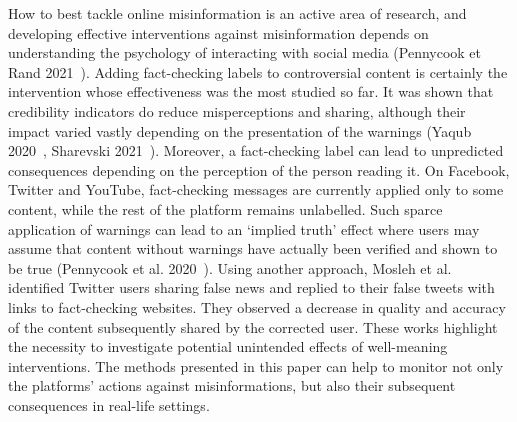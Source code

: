 \documentclass{article}
\begin{document}
\smallskip

How to best tackle online misinformation is an active area of research, and developing effective interventions against misinformation depends on understanding the psychology of interacting with social media (Pennycook et Rand 2021~\cite{pennycook2021psychology}). 
Adding fact-checking labels to controversial content is certainly the intervention whose effectiveness was the most studied so far. 
It was shown that credibility indicators do reduce misperceptions and sharing, although their impact varied vastly depending on the presentation of the warnings (Yaqub 2020~\cite{yaqub2020effects}, Sharevski 2021~\cite{sharevski2021misinformation}).
Moreover, a fact-checking label can lead to unpredicted consequences depending on the perception of the person reading it.
On Facebook, Twitter and YouTube, fact-checking messages are currently applied only to some content, while the rest of the platform remains unlabelled. 
Such sparce application of warnings can lead to an `implied truth' effect where users may assume that content without warnings have actually been verified and shown to be true (Pennycook et al. 2020~\cite{pennycook2020implied}).
Using another approach, Mosleh et al. \cite{mosleh2021perverse} identified Twitter users sharing false news and replied to their false tweets with links to fact-checking websites.
They observed a decrease in quality and accuracy of the content subsequently shared by the corrected user. 
These works highlight the necessity to investigate potential unintended effects of well-meaning interventions.
The methods presented in this paper can help to monitor not only the platforms' actions against misinformations, but also their subsequent consequences in real-life settings.

\smallskip

	


\end{document}
